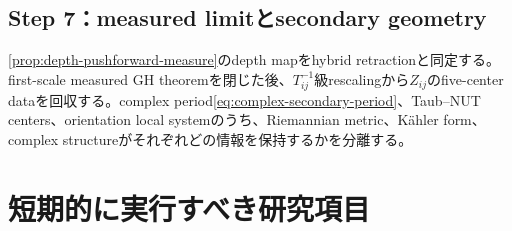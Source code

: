 \documentclass[11pt,a4paper]{ltjsarticle}
\theoremstyle{definition}
\theoremstyle{remark}
\begin{document}
\subsection{Step 7：measured limitとsecondary geometry}

\cref{prop:depth-pushforward-measure}のdepth mapをhybrid retractionと同定する。first-scale measured GH theoremを閉じた後、$T_{ij}^{-1}$級rescalingから$Z_{ij}$のfive-center dataを回収する。complex period\eqref{eq:complex-secondary-period}、Taub--NUT centers、orientation local systemのうち、Riemannian metric、Kähler form、complex structureがそれぞれどの情報を保持するかを分離する。

\section{短期的に実行すべき研究項目}
\end{document}

